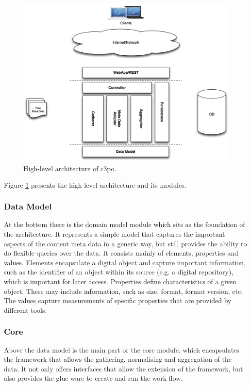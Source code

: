 \begin{figure}[htb]
\begin{center}
\includegraphics[width=5.5in]{figures/architecture/c3po_highlevel_architecture.png}
\caption{High-level architecture of c3po.}
\label{fig:architecture_highlevel}
\end{center}
\end{figure}

Figure \ref{fig:architecture_highlevel} presents the high level architecture and its modules.

\subsubsection{Data Model}

At the bottom there is the domain model module which sits as the foundation of the architecture. It represents a simple model that captures the important aspects of the content meta data in a generic way, but still provides the ability to do flexible queries over the data. It consists mainly of elements, properties and values. Elements encapsulate a digital object and capture important information, such as the identifier of an object within its source (e.g. a digital repository), which is important for later access. Properties define characteristics of a given object. These may include information, such as size, format, format version, etc. The values capture measurements of specific properties that are provided by different tools.

\subsubsection{Core}
Above the data model is the main part or the core module, which encapsulates the framework that allows the gathering, normalising and aggregation of the data. It not only offers interfaces that allow the extension of the framework, but also provides the glue-ware to create and run the work flow.


